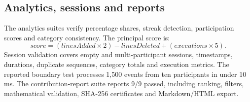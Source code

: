 \documentclass[11pt,a4paper]{article}
\begin{document}
\subsection{Analytics, sessions and reports}
The analytics suites verify percentage shares, streak detection, participation
scores and category consistency. The principal score is:
\[
\mathit{score}=(\mathit{linesAdded}\times2)-\mathit{linesDeleted}
                  +(\mathit{executions}\times5).
\]
Session validation covers empty and multi-participant sessions, timestamps,
durations, duplicate sequences, category totals and execution metrics. The
reported boundary test processes 1,500 events from ten participants in under
10\,ms. The contribution-report suite reports 9/9 passed, including ranking,
filters, mathematical validation, SHA-256 certificates and Markdown/HTML export.
\end{document}
